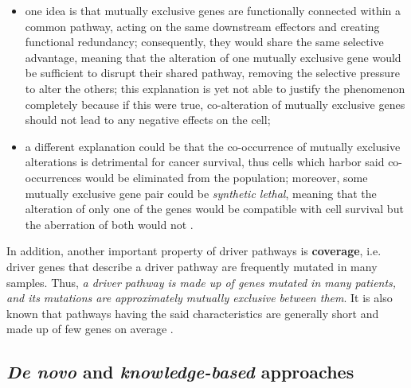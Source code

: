 \begin{itemize}
    \item one idea is that mutually exclusive genes are functionally connected within a common pathway, acting on the same downstream effectors and creating functional redundancy; consequently, they would share the same selective advantage, meaning that the alteration of one mutually exclusive gene would be sufficient to disrupt their shared pathway, removing the selective pressure to alter the others; this explanation is yet not able to justify the phenomenon completely because if this were true, co-alteration of mutually exclusive genes should not lead to any negative effects on the cell;
    \item a different explanation could be that the co-occurrence of mutually exclusive alterations is detrimental for cancer survival, thus cells which harbor said co-occurrences would be eliminated from the population; moreover, some mutually exclusive gene pair could be \textit{synthetic lethal}, meaning that the alteration of only one of the genes would be compatible with cell survival but the aberration of both would not .
\end{itemize}

In addition, another important property of driver pathways is \textbf{coverage}, i.e. driver genes that describe a driver pathway are frequently mutated in many samples. Thus, \textit{a driver pathway is made up of genes mutated in many patients, and its mutations are approximately mutually exclusive between them}. It is also known that pathways having the said characteristics are generally short and made up of few genes on average \cite{multi-dendrix}.

\subsection{\textit{De novo} and \textit{knowledge-based} approaches}

